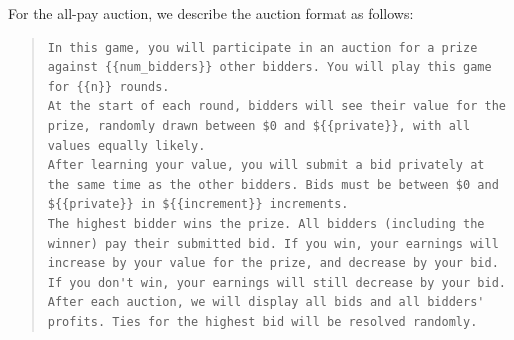 \documentclass{article} %
\begin{document}
For the all-pay auction, we describe the auction format as follows:
\begin{quote}
\begin{lstlisting}[basicstyle=\ttfamily, breaklines=true]
In this game, you will participate in an auction for a prize against {{num_bidders}} other bidders. You will play this game for {{n}} rounds.
At the start of each round, bidders will see their value for the prize, randomly drawn between $0 and ${{private}}, with all values equally likely.
After learning your value, you will submit a bid privately at the same time as the other bidders. Bids must be between $0 and ${{private}} in ${{increment}} increments.
The highest bidder wins the prize. All bidders (including the winner) pay their submitted bid. If you win, your earnings will increase by your value for the prize, and decrease by your bid. If you don't win, your earnings will still decrease by your bid.
After each auction, we will display all bids and all bidders' profits. Ties for the highest bid will be resolved randomly.
\end{lstlisting}
\end{quote}
\end{document}
